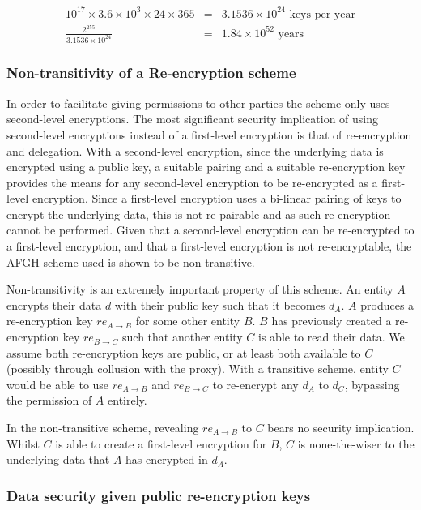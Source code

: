 $$
\begin{aligned}
  10^{17} \times 3.6 \times 10^{3} \times 24 \times 365 &=& 3.1536 \times 10^{24} \text{ keys per year} \\
  \frac{2^{255}}{3.1536 \times 10^{24}} &=& 1.84 \times 10^{52} \text{ years}
\end{aligned}
$$

\subsubsection{Non-transitivity of a Re-encryption scheme}

In order to facilitate giving permissions to other parties the scheme only uses second-level encryptions. The most significant security implication of using second-level encryptions instead of a first-level encryption is that of re-encryption and delegation. With a second-level encryption, since the underlying data is encrypted using a public key, a suitable pairing and a suitable re-encryption key provides the means for any second-level encryption to be re-encrypted as a first-level encryption. Since a first-level encryption uses a bi-linear pairing of keys to encrypt the underlying data, this is not re-pairable and as such re-encryption cannot be performed. Given that a second-level encryption can be re-encrypted to a first-level encryption, and that a first-level encryption is not re-encryptable, the AFGH scheme used is shown to be non-transitive.

Non-transitivity is an extremely important property of this scheme. An entity $A$ encrypts their data $d$ with their public key such that it becomes $d_A$. $A$ produces a re-encryption key $re_{A \rightarrow B}$ for some other entity $B$. $B$ has previously created a re-encryption key $re_{B \rightarrow C}$ such that another entity $C$ is able to read their data. We assume both re-encryption keys are public, or at least both available to $C$ (possibly through collusion with the proxy). With a transitive scheme, entity $C$ would be able to use $re_{A \rightarrow B}$ and $re_{B \rightarrow C}$ to re-encrypt any $d_A$ to $d_C$, bypassing the permission of $A$ entirely.

In the non-transitive scheme, revealing $re_{A \rightarrow B}$ to $C$ bears no security implication. Whilst $C$ is able to create a first-level encryption for $B$, $C$ is none-the-wiser to the underlying data that $A$ has encrypted in $d_A$.

\subsubsection{Data security given public re-encryption keys}

